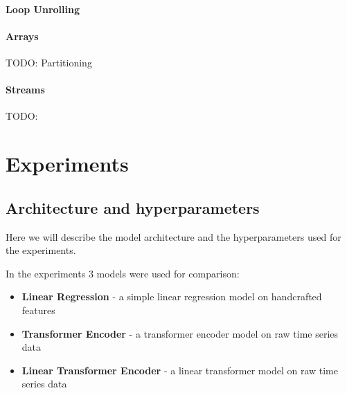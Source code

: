 \documentclass[a4paper, twoside]{report}
\theoremstyle{definition}
\numberwithin{equation}{section}
\begin{document}
\subsubsection{Loop Unrolling}


\subsubsection{Arrays}

TODO: Partitioning

\subsubsection{Streams}

TODO:





\chapter{Experiments}


\section{Architecture and hyperparameters}


Here we will describe the model architecture and the hyperparameters used for the experiments.

In the experiments 3 models were used for comparison:
\begin{itemize}
    \item \textbf{Linear Regression} - a simple linear regression model on handcrafted features
    \item \textbf{Transformer Encoder} - a transformer encoder model on raw time series data
    \item \textbf{Linear Transformer Encoder} - a linear transformer model on raw time series data
\end{itemize}
\end{document}

